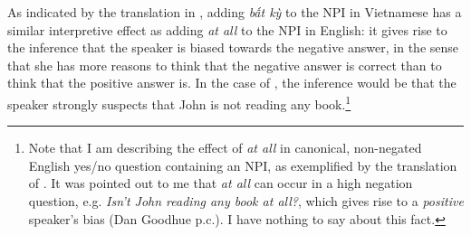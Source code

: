 \documentclass[output=paper,colorlinks,citecolor=brown]{langscibook}
\begin{document}
As indicated by the translation in , adding \textit{bất kỳ} to the NPI in Vietnamese has a similar interpretive effect as adding \textit{at all} to the NPI in English: it gives rise to the inference that the speaker is biased towards the negative answer, in the sense that she has more reasons to think that the negative answer is correct than to think that the positive answer is. In the case of , the inference would be that the speaker strongly suspects that John is not reading any book.\footnote{Note that I am describing the effect of \textit{at all} in canonical, non-negated English yes/no question containing an NPI, as exemplified by the translation of . It was pointed out to me that \textit{at all} can occur in a high negation question, e.g. \textit{Isn't John reading any book at all?}, which gives rise to a \textit{positive} speaker's bias (Dan Goodhue p.c.). I have nothing to say about this fact.}  %
\end{document}
